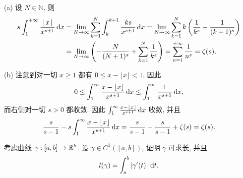 \documentclass{article}
\begin{document}
\begin{solution}
  (a) 设 \( N\in\mathbb{N} \), 则
  \begin{align*}
    s \int_{1}^{+\infty}\frac{\left\lfloor x \right\rfloor}{x^{s+1}}\,\mathrm{d} x
    &= \lim_{N\to\infty} \sum_{k=1}^{N} \int_{k}^{k+1} \frac{k s}{x^{s+1}}\,\mathrm{d} x
    = \lim_{N\to\infty} \sum_{k=1}^{N} k\left( \frac{1}{k^s}-\frac{1}{(k+1)^s} \right)\\
    &= \lim_{N\to\infty} \left( -\frac{N}{(N+1)^s} + \sum_{k=1}^{N}\frac{1}{k^s} \right) 
    = \sum_{n=1}^{+\infty}\frac{1}{n^s}=\zeta(s).
  \end{align*}

  (b) 注意到对一切 \( x\ge 1 \) 都有 \( 0\le x-\lfloor x\rfloor < 1 \). 因此
  \[ 0\le \int_1^\infty \frac{x-\lfloor x\rfloor}{x^{s+1}}\,\mathrm{d} x
  \le \int_1^\infty \frac{1}{x^{s+1}}\,\mathrm{d} x, \]
  而右侧对一切 \( s>0 \) 都收敛. 因此 \( \int_1^\infty \frac{x-\lfloor x\rfloor}{x^{s+1}}\,\mathrm{d} x \) 收敛, 并且
  \[  \frac{s}{s-1} - s\int_1^\infty \frac{x-\lfloor x\rfloor}{x^{s+1}}\,\mathrm{d} x
  =\frac{s}{s-1}-\frac{s}{s-1} + \zeta(s)=\zeta(s). \]
\end{solution}



\begin{problem}
考虑曲线 $\gamma:[a,b]\to\mathbb{R}^k$. 设 $\gamma\in C^1([a,b])$, 证明 $\gamma$ 可求长, 并且
\[
l(\gamma)=\int_a^b \left|\gamma'(t)\right|\,\mathrm{d} t.
\]
\end{problem}
\end{document}

